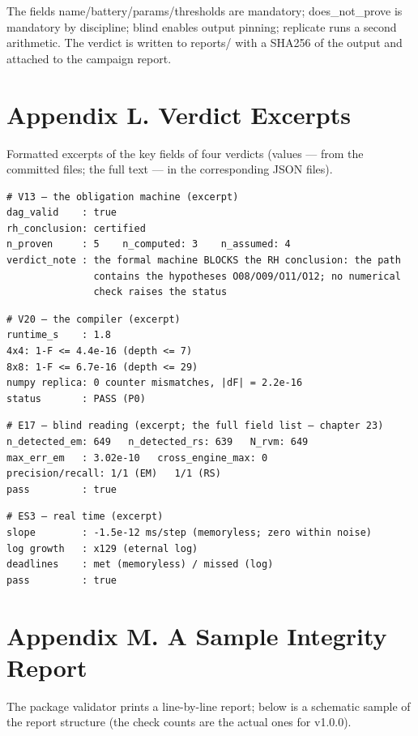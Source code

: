 \documentclass[11pt,a4paper]{article}
\begin{document}
The fields name/battery/params/thresholds are mandatory; does\_not\_prove is mandatory by discipline; blind enables output pinning; replicate runs a second arithmetic. The verdict is written to reports/ with a SHA256 of the output and attached to the campaign report.

\section{Appendix L. Verdict Excerpts}

Formatted excerpts of the key fields of four verdicts (values — from the committed files; the full text — in the corresponding JSON files).

\begin{verbatim}
# V13 — the obligation machine (excerpt)
dag_valid    : true
rh_conclusion: certified
n_proven     : 5    n_computed: 3    n_assumed: 4
verdict_note : the formal machine BLOCKS the RH conclusion: the path
               contains the hypotheses O08/O09/O11/O12; no numerical
               check raises the status
\end{verbatim}

\begin{verbatim}
# V20 — the compiler (excerpt)
runtime_s    : 1.8
4x4: 1-F <= 4.4e-16 (depth <= 7)
8x8: 1-F <= 6.7e-16 (depth <= 29)
numpy replica: 0 counter mismatches, |dF| = 2.2e-16
status       : PASS (P0)
\end{verbatim}

\begin{verbatim}
# E17 — blind reading (excerpt; the full field list — chapter 23)
n_detected_em: 649   n_detected_rs: 639   N_rvm: 649
max_err_em   : 3.02e-10   cross_engine_max: 0
precision/recall: 1/1 (EM)   1/1 (RS)
pass         : true
\end{verbatim}

\begin{verbatim}
# ES3 — real time (excerpt)
slope        : -1.5e-12 ms/step (memoryless; zero within noise)
log growth   : x129 (eternal log)
deadlines    : met (memoryless) / missed (log)
pass         : true
\end{verbatim}

\section{Appendix M. A Sample Integrity Report}

The package validator prints a line-by-line report; below is a schematic sample of the report structure (the check counts are the actual ones for v1.0.0).
\end{document}
